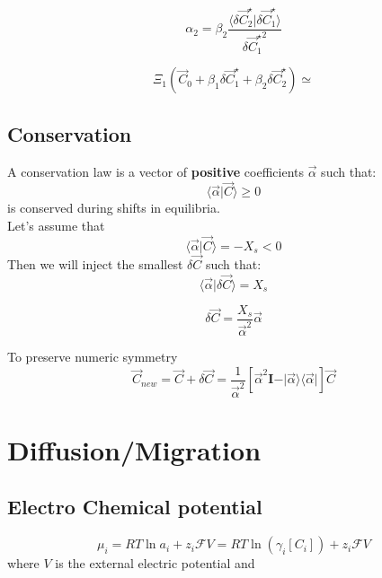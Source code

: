\documentclass[aps,12pt]{revtex4}
\begin{document}
\begin{equation}
	\alpha_2 = \beta_2 \dfrac{\langle \delta \vec C_2^\star \vert \delta \vec C_1^\star\rangle}{ {\delta \vec C_1^\star} ^2 }
\end{equation}

\begin{equation}
	\Xi_1(\vec C_0 + \beta_1 \delta \vec C_1^\star + \beta_2 \delta \vec C_2^\star) 
	\simeq 
\end{equation}

\subsection{Conservation}

A conservation law is a vector of {\bf positive} coefficients $\vec \alpha$ such that:
\begin{equation}
	\langle \vec \alpha \vert \vec C \rangle \geq 0
\end{equation}
is conserved during shifts in equilibria.\\
Let's assume that
\begin{equation}
	\langle \vec \alpha \vert \vec C \rangle = -X_s < 0 
\end{equation}
Then we will inject the smallest $\delta \vec C$ such that:
\begin{equation}
	\langle \vec \alpha \vert \delta \vec C \rangle = X_s
\end{equation}

\begin{equation}
	\delta \vec C = \dfrac{X_s}{\vec\alpha^2} \vec{\alpha}
\end{equation}

To preserve numeric symmetry
\begin{equation}
	\vec C_{new} = \vec C + \delta \vec C = \dfrac{1}{\vec \alpha^2}\left[\vec \alpha^2 \bm{I} - \vert \vec \alpha \rangle \langle \vec \alpha \vert \right] \vec C
\end{equation}

 	

\section{Diffusion/Migration}

\subsection{Electro Chemical potential}

\begin{equation}
	\mu_i = RT \ln a_i + z_i \mathcal{F} V = RT \ln (\gamma_i[C_i]) + z_i \mathcal{F} V
\end{equation}
where $V$ is the external electric potential and
\end{document}
